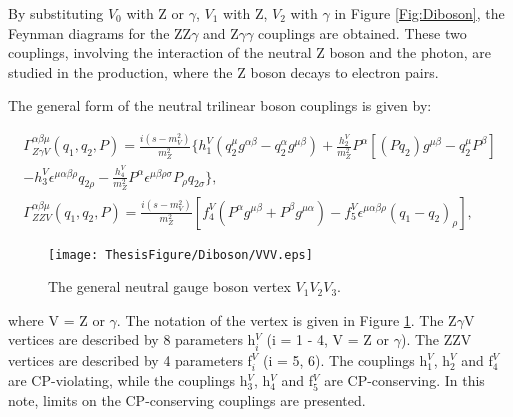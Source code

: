 \documentclass[12pt,twoside,letterpaper]{article}
\begin{document}
 By substituting $V_0$ with Z or $\gamma$, $V_1$ with Z, $V_2$ with $\gamma$ in Figure \ref{Fig:Diboson}, the Feynman diagrams for the ZZ$\gamma$ and Z$\gamma\gamma$ couplings are obtained. 
These two couplings, involving the
interaction of the neutral Z boson and the photon, are studied in
the \Zg production, where the Z boson decays to electron pairs. 

The general form of the neutral trilinear boson couplings is given by\cite{nTGC}:

    \begin{eqnarray*}
	\Gamma_{Z\gamma V}^{\alpha\beta\mu}(q_1, q_2, P) = \frac{i(s - m_V^2)}{m_Z^2} \{h_1^V(q_2^{\mu}g^{\alpha\beta} - q_2^{\alpha}g^{\mu\beta}) + \frac{h_2^V}{m_Z^2}P^{\alpha}[(Pq_2)g^{\mu\beta} - q_2^{\mu}P^{\beta}] \\
	-h_3^V\epsilon^{\mu\alpha\beta\rho}q_{2\rho} - \frac{h_4^V}{m_Z^2}P^{\alpha}\epsilon^{\mu\beta\rho\sigma}P_{\rho}q_{2\sigma}\},		\\
	\Gamma_{ZZV}^{\alpha\beta\mu}(q_1, q_2, P) = \frac{i(s - m_V^2)}{m_Z^2} [f_4^V(P^{\alpha}g^{\mu\beta} + P^{\beta}g^{\mu\alpha}) - f_5^V\epsilon^{\mu\alpha\beta\rho}(q_1 - q_2)_{\rho}],		
	\label{eq:zzv}
    \end{eqnarray*}
    \begin{figure}[!htbp]
    \begin{center}
        \texttt{[image: ThesisFigure/Diboson/VVV.eps]}
        \caption{The general neutral gauge boson vertex $V_1 V_2 V_3$\cite{nTGC}.} 
    \label{Fig:VVV}
    \end{center}
    \end{figure}
%
where V = Z or $\gamma$. The notation of the vertex is given in Figure \ref{Fig:VVV}. The Z$\gamma$V vertices are described by 8
parameters h$^V_i$ (i = 1 - 4, V = Z or $\gamma$). The ZZV vertices
are described by 4 parameters f$^V_i$ (i = 5, 6). The couplings h$_1^V$, h$_2^V$ and f$_4^V$ are CP-violating, 
while the couplings h$_3^V$, h$_4^V$ and f$_5^V$ are CP-conserving. In
this note, limits on the CP-conserving couplings are presented. 
\end{document}
